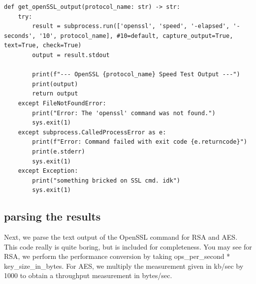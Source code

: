 \documentclass[11pt]{article}
\begin{document}
\begin{lstlisting}
def get_openSSL_output(protocol_name: str) -> str:
    try:
        result = subprocess.run(['openssl', 'speed', '-elapsed', '-seconds', '10', protocol_name], #10=default, capture_output=True, text=True, check=True)
        output = result.stdout
        
        print(f"--- OpenSSL {protocol_name} Speed Test Output ---")
        print(output)
        return output
    except FileNotFoundError:
        print("Error: The 'openssl' command was not found.")
        sys.exit(1)
    except subprocess.CalledProcessError as e:
        print(f"Error: Command failed with exit code {e.returncode}")
        print(e.stderr)
        sys.exit(1)
    except Exception:
        print("something bricked on SSL cmd. idk")
        sys.exit(1)
\end{lstlisting}

\subsection*{parsing the results}

Next, we parse the text output of the OpenSSL command for RSA and AES. This code really is quite boring, but is included for completeness. You may see for RSA, we perform the performance conversion by taking ops\_per\_second * key\_size\_in\_bytes. For AES, we multiply the measurement given in kb/sec by 1000 to obtain a throughput measurement in bytes/sec.
\end{document}
